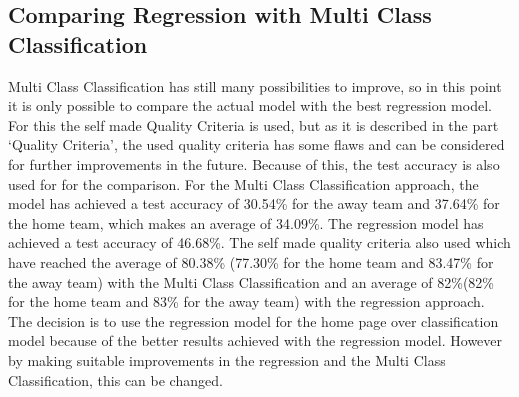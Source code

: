 \subsection{Comparing Regression with Multi Class Classification}
 Multi Class Classification has still many possibilities to improve, so in this point it is only possible to compare the actual model with the best regression model. For this the self made Quality Criteria is used, but as it is described in the part `Quality Criteria', the used quality criteria has some flaws and can be considered for further improvements in the future. Because of this, the test accuracy is also used for for the comparison. For the Multi Class Classification approach, the model has achieved a test accuracy of 30.54\% for the away team and 37.64\% for the home team, which makes an average of 34.09\%. The regression model has achieved a test accuracy of 46.68\%. The self made quality criteria also used which have reached the average of  80.38\% (77.30\% for the home team and 83.47\% for the away team) with the Multi Class Classification and an average of 82\%(82\% for the home team and 83\% for the away team) with the regression approach. The decision is to use the regression model for the home page over classification model because of the better results achieved with the regression model. However by making suitable improvements in the regression and the Multi Class Classification, this can be changed.